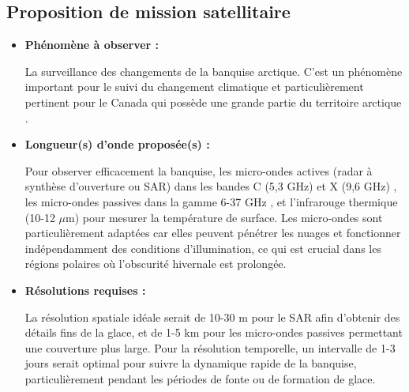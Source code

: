 \documentclass[12pt,a4paper]{article}
\begin{document}
\subsection{Proposition de mission satellitaire}
\begin{itemize}[label=---]
    \item \textbf{Phénomène à observer :}
    
    La surveillance des changements de la banquise arctique. C'est un phénomène important pour le suivi du changement climatique et particulièrement pertinent pour le Canada qui possède une grande partie du territoire arctique \citep{Derksen2019}.
    
    \item \textbf{Longueur(s) d'onde proposée(s) :}
        
    Pour observer efficacement la banquise, les micro-ondes actives (radar à synthèse d'ouverture ou SAR) dans les bandes C (5,3 GHz) et X (9,6 GHz) \citep{Liu2023}, les micro-ondes passives dans la gamme 6-37 GHz \citep{Webster2023}, et l'infrarouge thermique (10-12 $\mu$m) pour mesurer la température de surface. Les micro-ondes sont particulièrement adaptées car elles peuvent pénétrer les nuages et fonctionner indépendamment des conditions d'illumination, ce qui est crucial dans les régions polaires où l'obscurité hivernale est prolongée.
    
    \item \textbf{Résolutions requises :}
    
    La résolution spatiale idéale serait de 10-30 m pour le SAR afin d'obtenir des détails fins de la glace, et de 1-5 km pour les micro-ondes passives permettant une couverture plus large. Pour la résolution temporelle, un intervalle de 1-3 jours serait optimal pour suivre la dynamique rapide de la banquise, particulièrement pendant les périodes de fonte ou de formation de glace.
\end{itemize}
\end{document}
